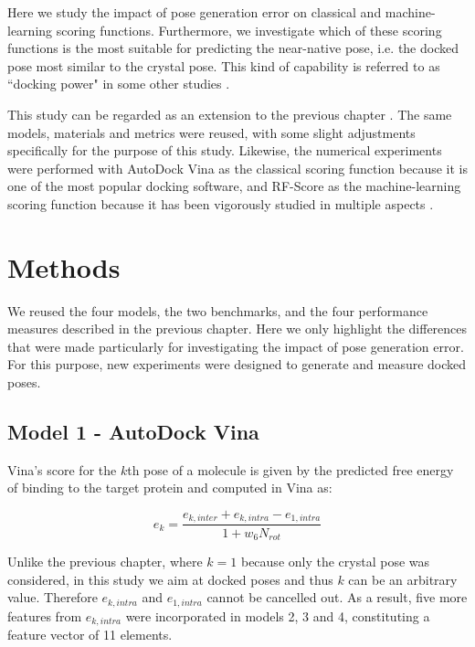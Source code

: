 Here we study the impact of pose generation error on classical and machine-learning scoring functions. Furthermore, we investigate which of these scoring functions is the most suitable for predicting the near-native pose, i.e. the docked pose most similar to the crystal pose. This kind of capability is referred to as ``docking power" in some other studies \citep{1411}.

This study can be regarded as an extension to the previous chapter \citep{1433}. The same models, materials and metrics were reused, with some slight adjustments specifically for the purpose of this study. Likewise, the numerical experiments were performed with AutoDock Vina \citep{595} as the classical scoring function because it is one of the most popular docking software, and RF-Score \citep{564} as the machine-learning scoring function because it has been vigorously studied in multiple aspects \citep{1281,1362,1370}.

\section{Methods}

We reused the four models, the two benchmarks, and the four performance measures described in the previous chapter. Here we only highlight the differences that were made particularly for investigating the impact of pose generation error. For this purpose, new experiments were designed to generate and measure docked poses.

\subsection{Model 1 - AutoDock Vina}

Vina's score for the $k$th pose of a molecule is given by the predicted free energy of binding to the target protein and computed in Vina as:

\begin{equation}
\label{rfscore4:e_k}
e_k=\frac{e_{k,inter}+e_{k,intra}-e_{1,intra}}{1+w_6N_{rot}}
\end{equation}

Unlike the previous chapter, where $k=1$ because only the crystal pose was considered, in this study we aim at docked poses and thus $k$ can be an arbitrary value. Therefore $e_{k,intra}$ and $e_{1,intra}$ cannot be cancelled out. As a result, five more features from $e_{k,intra}$ were incorporated in models 2, 3 and 4, constituting a feature vector of 11 elements.

